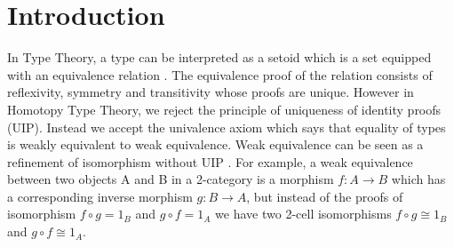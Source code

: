 \documentclass{acm_proc_article-sp}
\newcommand{\og}{$\omega$-groupoids}
\newcommand{\wog}{weak $\omega$-groupoids}
\newcommand{\hott}{Homotopy Type Theory}
\begin{document}
\begin{abstract}

  Weak $\omega$-groupoids are the higher dimensional generalisation of
  setoids and are an essential ingredient of the constructive
  semantics of Homotopy Type Theory \cite{hott}.  Following up on our
  previous formalisation \cite{txa:csl} and Brunerie's notes
  \cite{gb:wog}, we present a new formalisation of the syntax of weak
  $\omega$-groupoids in Agda using heterogeneous equality. We show how
  to recover basic constructions on $\omega$-groupoids using
  suspension and replacement. In particular we show that any type
  forms a groupoid and we outline how to derive higher dimensional
  composition. We present a possible semantics using globular sets and
  discuss the issues which arise when using globular types instead.


\end{abstract}






\section{Introduction}



In Type Theory, a type can be interpreted as a setoid which is a set equipped with an equivalence relation \cite{alti:lics99}.
The equivalence proof of the relation consists of reflexivity, symmetry and transitivity whose proofs are unique. 
However in \hott{}, we reject the principle of uniqueness of identity proofs (UIP). 
Instead we accept the univalence axiom which says that equality of types is weakly equivalent to weak equivalence. 
Weak equivalence can be seen as a refinement of isomorphism without UIP \cite{txa:csl}. 
For example, a weak equivalence 
between two objects A and B in a 2-category is a morphism $f : A \rightarrow B$ which has a
corresponding inverse morphism $ g : B \rightarrow A$, but instead of the
proofs of isomorphism $f ∘ g = 1_B$ and  $g ∘ f = 1_A$ we have two
2-cell isomorphisms  $f ∘ g ≅ 1_B$ and  $g ∘ f ≅ 1_A$. 
\end{document}
